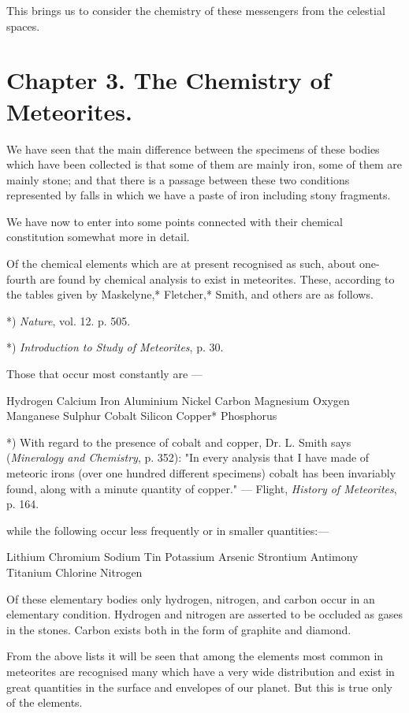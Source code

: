 \documentclass[a4paper, 12pt, oneside, polutonikogreek, english]{article}
\begin{document}
This brings us to consider the chemistry of these messengers from the celestial spaces.

\section{Chapter 3. The Chemistry of Meteorites.}

We have seen that the main difference between the specimens of these bodies which have been collected is that some of them are mainly iron, some of them are mainly stone; and that there is a passage between these two conditions represented by falls in which we have a paste of iron including stony fragments.

We have now to enter into some points connected with their chemical constitution somewhat more in detail.

Of the chemical elements which are at present recognised as such, about one-fourth are found by chemical analysis to exist in meteorites. These, according to the tables given by Maskelyne,* Fletcher,* Smith, and others are as follows.

*) \emph{Nature}, vol. 12. p. 505.

*) \emph{Introduction to Study of Meteorites}, p. 30.

Those that occur most constantly are ---

Hydrogen 
Calcium 
Iron 
Aluminium 
Nickel 
Carbon 
Magnesium 
Oxygen 
Manganese 
Sulphur 
Cobalt 
Silicon 
Copper* 
Phosphorus 

*) With regard to the presence of cobalt and copper, Dr. L. Smith says (\emph{Mineralogy and Chemistry}, p. 352): "In every analysis that I have made of meteoric irons (over one hundred different specimens) cobalt has been invariably found, along with a minute quantity of copper." --- Flight, \emph{History of Meteorites}, p. 164.

while the following occur less frequently or in smaller quantities:---

Lithium 
Chromium Sodium 
Tin Potassium 
Arsenic Strontium 
Antimony Titanium 
Chlorine Nitrogen 

Of these elementary bodies only hydrogen, nitrogen, and carbon occur in an elementary condition. Hydrogen and nitrogen are asserted to be occluded as gases in the stones. Carbon exists both in the form of graphite and diamond.

From the above lists it will be seen that among the elements most common in meteorites are recognised many which have a very wide distribution and exist in great quantities in the surface and envelopes of our planet. But this is true only of the elements.
\end{document}

